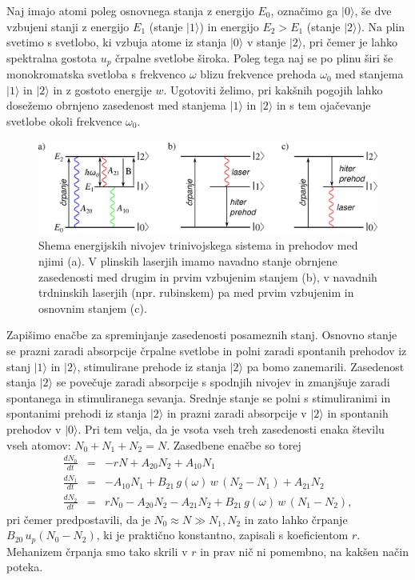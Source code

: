 Naj imajo atomi poleg osnovnega stanja z energijo $E_0$, označimo ga $|0\rangle$,
še dve vzbujeni stanji z energijo $E_1$ (stanje $|1\rangle$) in energijo $E_2>E_1$
(stanje $|2\rangle$). Na plin svetimo s svetlobo, ki
vzbuja atome iz stanja $|0\rangle$ v stanje $|2\rangle$, pri čemer
je lahko spektralna gostota $u_{p}$ črpalne svetlobe široka. Poleg
tega naj se po plinu širi še monokromatska svetloba s frekvenco $\omega$
blizu frekvence prehoda $\omega_{0}$ med stanjema $|1\rangle$ in
$|2\rangle$ in z gostoto energije $w$. Ugotoviti želimo, pri kakšnih
pogojih lahko dosežemo obrnjeno zasedenost med stanjema $|1\rangle$ in $|2\rangle$
in s tem ojačevanje svetlobe okoli frekvence $\omega_{0}$.
\begin{figure}[h]
\centering
\includegraphics[width=14truecm]{slike/05_Trinivojski.png}
\caption{Shema energijskih nivojev trinivojskega sistema in prehodov med njimi (a).
V plinskih laserjih imamo navadno stanje obrnjene zasedenosti med drugim in prvim
vzbujenim stanjem (b), v navadnih trdninskih laserjih (npr. rubinskem) pa med 
prvim vzbujenim in osnovnim stanjem (c).}
\label{fig:3nivojski}
\end{figure}

Zapišimo enačbe za spreminjanje zasedenosti posameznih stanj. Osnovno stanje
se prazni zaradi absorpcije črpalne svetlobe in polni zaradi
spontanih prehodov iz stanj $|1\rangle$ in $|2\rangle$, stimulirane
prehode iz stanja $|2\rangle$ pa bomo zanemarili. Zasedenost stanja $|2\rangle$ se
povečuje zaradi absorpcije s spodnjih nivojev in zmanjšuje
zaradi spontanega in stimuliranega sevanja. Srednje stanje se polni
s stimuliranimi in spontanimi prehodi iz stanja $|2\rangle$ in prazni
zaradi absorpcije v $|2\rangle$ in spontanih prehodov v $|0\rangle$.
Pri tem velja, da je vsota vseh treh zasedenosti enaka številu vseh atomov: $N_{0}+N_{1}+N_{2}=N$. 
Zasedbene enačbe so torej 
\begin{eqnarray}
\frac{dN_{0}}{dt} & = & -rN+A_{20}N_{2}+A_{10}N_{1} \label{4.39.1}\\
\frac{dN_{1}}{dt} & = & -A_{10}N_{1}+B_{21}\,g(\omega)\,w\, (N_{2}-N_{1})+A_{21}N_{2} \label{4.39.2}\\
\frac{dN_{2}}{dt} & = & rN_0-A_{20}N_{2}-A_{21}N_{2}+B_{21}\,g(\omega)\,w\, (N_1-N_2),
\label{4.39}
\end{eqnarray}
pri čemer predpostavili, da je $N_0 \approx N \gg N_1, N_2$ in zato lahko črpanje $B_{20}\, 
u_{p} (N_0-N_2)$, ki je praktično konstantno, zapisali s koeficientom $r$. Mehanizem črpanja 
smo tako skrili v $r$ in prav nič ni pomembno, na kakšen način poteka. 

